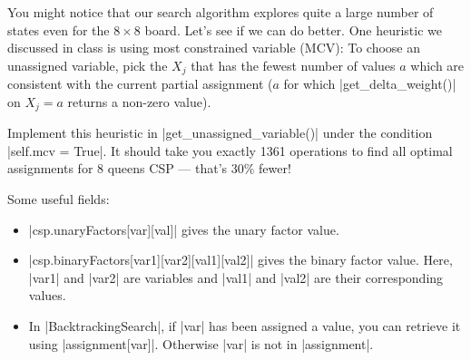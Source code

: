\item {}
You might notice that our search algorithm explores quite a large number of
states even for the $8\times 8$ board. Let's see if we can do better. One
heuristic we discussed in class is using most constrained variable (MCV): To
choose an unassigned variable, pick the $X_j$ that has the fewest number of
values $a$ which are consistent with the current partial assignment ($a$ for
which |get_delta_weight()| on $X_j=a$ returns a non-zero value).

Implement this heuristic in |get_unassigned_variable()| under the condition
|self.mcv = True|. It should take you exactly 1361 operations to find all
optimal assignments for 8 queens CSP --- that's 30\% fewer!

Some useful fields:
\begin{itemize}
  \item |csp.unaryFactors[var][val]| gives the unary factor value.
  \item |csp.binaryFactors[var1][var2][val1][val2]| gives the binary factor
  value. Here, |var1| and |var2| are variables and |val1| and |val2| are their
  corresponding values.
  \item In |BacktrackingSearch|, if |var| has been assigned a value, you can
  retrieve it using |assignment[var]|. Otherwise |var| is not in |assignment|.
\end{itemize}
